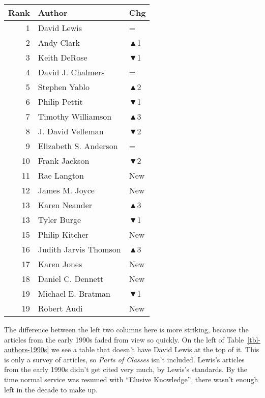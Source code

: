 \documentclass[
  10pt,
  letterpaper,
  DIV=11,
  numbers=noendperiod,
  twoside]{scrartcl}
\begin{document}
\begin{table}
\begin{minipage}{0.25\linewidth}
{\begin{tabular}{rll}
\toprule
Rank & Author & Chg\\
\midrule
1 & David Lewis & =\\
2 & Andy Clark & \textcolor[RGB]{34,178,34}{▲1}\\
3 & Keith DeRose & \textcolor[RGB]{178,34,34}{▼1}\\
4 & David J. Chalmers & =\\
5 & Stephen Yablo & \textcolor[RGB]{34,178,34}{▲2}\\
6 & Philip Pettit & \textcolor[RGB]{178,34,34}{▼1}\\
7 & Timothy Williamson & \textcolor[RGB]{34,178,34}{▲3}\\
8 & J. David Velleman & \textcolor[RGB]{178,34,34}{▼2}\\
9 & Elizabeth S. Anderson & =\\
10 & Frank Jackson & \textcolor[RGB]{178,34,34}{▼2}\\
11 & Rae Langton & \textcolor[RGB]{34,178,34}{New}\\
12 & James M. Joyce & \textcolor[RGB]{34,178,34}{New}\\
13 & Karen Neander & \textcolor[RGB]{34,178,34}{▲3}\\
13 & Tyler Burge & \textcolor[RGB]{178,34,34}{▼1}\\
15 & Philip Kitcher & \textcolor[RGB]{34,178,34}{New}\\
16 & Judith Jarvis Thomson & \textcolor[RGB]{34,178,34}{▲3}\\
17 & Karen Jones & \textcolor[RGB]{34,178,34}{New}\\
18 & Daniel C. Dennett & \textcolor[RGB]{34,178,34}{New}\\
19 & Michael E. Bratman & \textcolor[RGB]{178,34,34}{▼1}\\
19 & Robert Audi & \textcolor[RGB]{34,178,34}{New}\\
\bottomrule
\end{tabular}

}

\end{minipage}%

\end{table}%

The difference between the left two columns here is more striking,
because the articles from the early 1990s faded from view so quickly. On
the left of Table~\ref{tbl-authors-1990s} we see a table that doesn't
have David Lewis at the top of it. This is only a survey of articles, so
\emph{Parts of Classes} isn't included. Lewis's articles from the early
1990s didn't get cited very much, by Lewis's standards. By the time
normal service was resumed with ``Elusive Knowledge'', there wasn't
enough left in the decade to make up.
\end{document}
